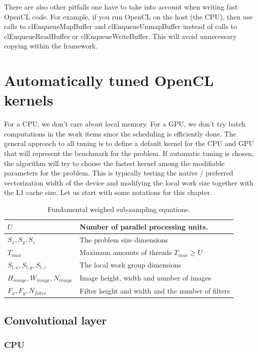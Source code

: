 \documentclass[a4paper,10pt]{article}
\theoremstyle{definition}
\begin{document}
There are also other pitfalls one have to take into account when writing fast OpenCL code. For example, if you run OpenCL on the host (the CPU), then use calls to clEnqueueMapBuffer and clEnqueueUnmapBuffer instead of calls to clEnqueueReadBuffer or clEnqueueWriteBuffer. This will avoid unnecessary copying within the framework.
  
\section{Automatically tuned OpenCL kernels}

For a CPU, we don't care about local memory. For a GPU, we don't try batch computations in the work items since the scheduling is efficiently done. The general approach to all tuning is to define a default kernel for the CPU and GPU that will represent the benchmark for the problem. If automatic tuning is chosen, the algorithm will try to choose the fastest kernel among the modifiable parameters for the problem. This is typically testing the native / preferred vectorization width of the device and modifying the local work size together with the L1 cache size. Let us start with some notations for this chapter.

\begin{table}[H]
	\centering
	\begin{tabular}{|l| l|}
		\hline
		$U$ & Number of parallel processing units.\\
		\hline
		$S_x, S_y, S_z$ & The problem size dimensions \\
		\hline
		$T_{max}$ & Maximum amounts of threads $T_{max} \geq U$ \\
		\hline
		$S_{l,x}, S_{l,y}, S_{l,z}$ & The local work group dimensions \\
		\hline
		$H_{image}, W_{image}, N_{image}$ & Image height, width and number of images\\
		\hline
		$F_{x}, F_{y}, N_{filter}$ & Filter height and width and the number of filters\\
		\hline
	\end{tabular}
	\caption{Fundamental weighed sub-sampling equations.}
\end{table}

\subsection{Convolutional layer}
\subsubsection{CPU}
\end{document}
